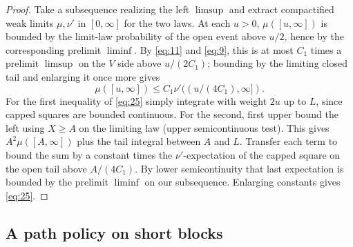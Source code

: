 \begin{proof}
Take a subsequence realizing the left \(\limsup\) and extract compactified weak limits \(\mu,\nu'\) in \([0,\infty]\) for the two laws. At each \(u>0\), \(\mu([u,\infty])\) is bounded by the limit-law probability of the open event above \(u/2\), hence by the corresponding prelimit \(\liminf\). By \eqref{eq:11} and \eqref{eq:9}, this is at most \(C_1\) times a prelimit \(\limsup\) on the \(V\) side above \(u/(2C_1)\); bounding by the limiting closed tail and enlarging it once more gives
\[
\mu([u,\infty])\le C_1\nu'((u/(4C_1),\infty]).
\]
For the first inequality of \eqref{eq:25} simply integrate with weight \(2u\) up to \(L\), since capped squares are bounded continuous. For the second, first upper bound the left using \(X\ge A\) on the limiting law (upper semicontinuous test). This gives \(A^2\mu([A,\infty])\) plus the tail integral between \(A\) and \(L\). Transfer each term to bound the sum by a constant times the \(\nu'\)-expectation of the capped square on the open tail above \(A/(4C_1)\). By lower semicontinuity that last expectation is bounded by the prelimit \(\liminf\) on our subsequence. Enlarging constants gives \eqref{eq:25}.
\end{proof}

\subsection{A path policy on short blocks}

